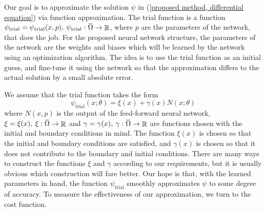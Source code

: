 \documentclass[10pt]{article}
\theoremstyle{plain}
\theoremstyle{definition}
\theoremstyle{remark}
\numberwithin{theorem}{section}
\numberwithin{proposition}{section}
\numberwithin{remark}{section}
\numberwithin{corollary}{section}
\numberwithin{definition}{section}
\numberwithin{lemma}{section}
\numberwithin{equation}{section}
\DeclareMathOperator{\T}{trial}
\newcommand{\overbar}[1]{\mkern 1.5mu\overline{\mkern-1.5mu#1\mkern-1.5mu}\mkern 1.5mu}
\DeclareMathOperator{\R}{\mathbb{R}}
\begin{document}
Our goal is to approximate the solution $\psi$ in (\ref{proposed method, differential equation}) via function approximation. The trial function is a function $\psi_{\T} = \psi_{\T}(x,p), \: \psi_{\T}: \overbar{\Omega} \to \R$, where $p$ are the parameters of the network, that does the job. For the proposed neural network structure, the parameters of the network are the weights and biases which will be learned by the network using an optimization algorithm. The idea is to use the trial function as an initial guess, and fine-tune it using the network so that the approximation differs to the actual solution by a small absolute error. 

We assume that the trial function takes the form 
\begin{equation}
	\label{trial function, form of the trial function}
	\displaystyle \psi_{\T}(x;\theta) = \xi(x) + \gamma(x)N(x;\theta)
\end{equation}
where $N(x,p)$ is the output of the feed-forward neural network, $\xi = \xi(x), \: \xi: \overbar{\Omega} \to \R$ and $\gamma = \gamma(x), \: \gamma : \overbar{\Omega} \to \R$ are functions chosen with the initial and boundary conditions in mind. The function $\xi(x)$ is chosen so that the initial and boundary conditions are satisfied, and $\gamma(x)$ is chosen so that it does not contribute to the boundary and initial conditions. There are many ways to construct the functions $\xi$ and $\gamma$ according to our requirements, but it is usually obvious which construction will fare better. Our hope is that, with the learned parameters in hand, the function $\psi_{\T}$ smoothly approximates $\psi$ to some degree of accuracy. To measure the effectiveness of our approximation, we turn to the cost function. 
\end{document}
